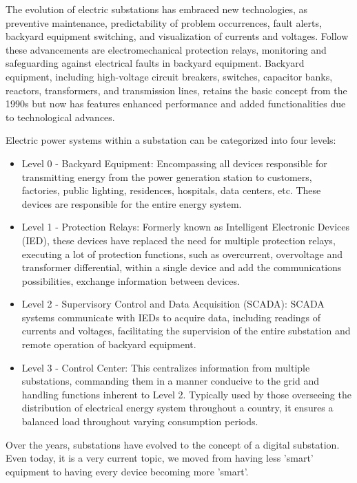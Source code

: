 The evolution of electric substations has embraced new technologies, as preventive maintenance, predictability of problem occurrences, fault alerts, backyard equipment switching, and visualization of currents and voltages. Follow these advancements are electromechanical protection relays, monitoring and safeguarding against electrical faults in backyard equipment.
Backyard equipment, including high-voltage circuit breakers, switches, capacitor banks, reactors, transformers, and transmission lines, retains the basic concept from the 1990s but now has features enhanced performance and added functionalities due to technological advances.

Electric power systems within a substation can be categorized into four levels:

\begin{itemize}
	\item Level 0 - Backyard Equipment: Encompassing all devices responsible for transmitting energy from the power generation station to customers, factories, public lighting, residences, hospitals, data centers, etc. These devices are responsible for the entire energy system.
	\item Level 1 - Protection Relays: Formerly known as Intelligent Electronic Devices (IED), these devices have replaced the need for multiple protection relays, executing a lot of protection functions, such as overcurrent, overvoltage and transformer differential, within a single device and add the communications possibilities, exchange information between devices.
	\item Level 2 - Supervisory Control and Data Acquisition (SCADA): SCADA systems communicate with IEDs to acquire data, including readings of currents and voltages, facilitating the supervision of the entire substation and remote operation of backyard equipment.
	\item Level 3 - Control Center: This centralizes information from multiple substations, commanding them in a manner conducive to the grid and handling functions inherent to Level 2. Typically used by those overseeing the distribution of electrical energy system throughout a country, it ensures a balanced load throughout varying consumption periods.
\end{itemize}

Over the years, substations have evolved to the concept of a digital substation. Even today, it is a very current topic, we moved from having less 'smart' equipment to having every device becoming more 'smart'.


